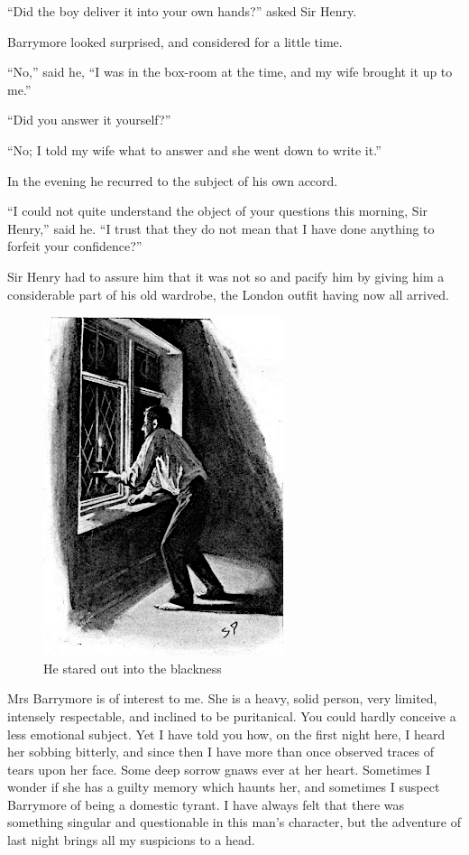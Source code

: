 \documentclass[paper=a5,BCOR=7mm,twoside,DIV=calc,12pt,usegeometry,openany,chapterprefix,endperiod,headings=big]{scrbook} %
\begin{document}
\enquote{Did the boy deliver it into your own hands?} asked Sir Henry.

Barrymore looked surprised, and considered for a little time.

\enquote{No,} said he, \enquote{I was in the box-room at the time, and my wife brought it up to me.}

\enquote{Did you answer it yourself?}

\enquote{No; I told my wife what to answer and she went down to write it.}

In the evening he recurred to the subject of his own accord.

\enquote{I could not quite understand the object of your questions this morning, Sir Henry,} said he. \enquote{I trust that they do not mean that I have done anything to forfeit your confidence?}

Sir Henry had to assure him that it was not so and pacify him by giving him a considerable part of his old wardrobe, the London outfit having now all arrived.
\begin{figure}
\centering
\includegraphics[width=.7\linewidth]{08_candle}
\caption{He stared out into the blackness}
\end{figure}

Mrs Barrymore is of interest to me. She is a heavy, solid person, very limited, intensely respectable, and inclined to be puritanical. You could hardly conceive a less emotional subject. Yet I have told you how, on the first night here, I heard her sobbing bitterly, and since then I have more than once observed traces of tears upon her face. Some deep sorrow gnaws ever at her heart. Sometimes I wonder if she has a guilty memory which haunts her, and sometimes I suspect Barrymore of being a domestic tyrant. I have always felt that there was something singular and questionable in this man's character, but the adventure of last night brings all my suspicions to a head.
\end{document}
